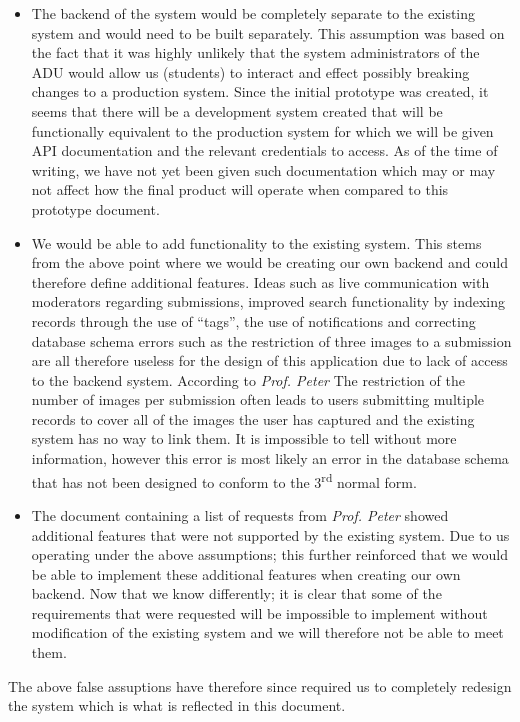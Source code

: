 \documentclass[
10pt, %
a4paper, %
oneside, %
headinclude,footinclude, %
BCOR5mm, %
]{scrartcl}
\begin{document}
\begin{itemize}
\item The backend of the system would be completely separate to the existing system and would need to be built separately. This assumption was based on the fact that it was highly unlikely that the system administrators of the ADU would allow us (students) to interact and effect possibly breaking changes to a production system. Since the initial prototype was created, it seems that there will be a development system created that will be functionally equivalent to the production system for which we will be given API documentation and the relevant credentials to access. As of the time of writing, we have not yet been given such documentation which may or may not affect how the final product will operate when compared to this prototype document.
\item We would be able to add functionality to the existing system. This stems from the above point where we would be creating our own backend and could therefore define additional features. Ideas such as live communication with moderators regarding submissions, improved search functionality by indexing records through the use of ``tags'', the use of notifications and correcting database schema errors such as the restriction of three images to a submission are all therefore useless for the design of this application due to lack of access to the backend system. According to \textit{Prof. Peter} The restriction of the number of images per submission often leads to users submitting multiple records to cover all of the images the user has captured and the existing system has no way to link them. It is impossible to tell without more information, however this error is most likely an error in the database schema that has not been designed to conform to the 3\textsuperscript{rd} normal form.
\item The document containing a list of requests from \textit{Prof. Peter} showed additional features that were not supported by the existing system. Due to us operating under the above assumptions; this further reinforced that we would be able to implement these additional features when creating our own backend. Now that we know differently; it is clear that some of the requirements that were requested will be impossible to implement without modification of the existing system and we will therefore not be able to meet them.
\end{itemize}

The above false assuptions have therefore since required us to completely redesign the system which is what is reflected in this document.
\end{document}
